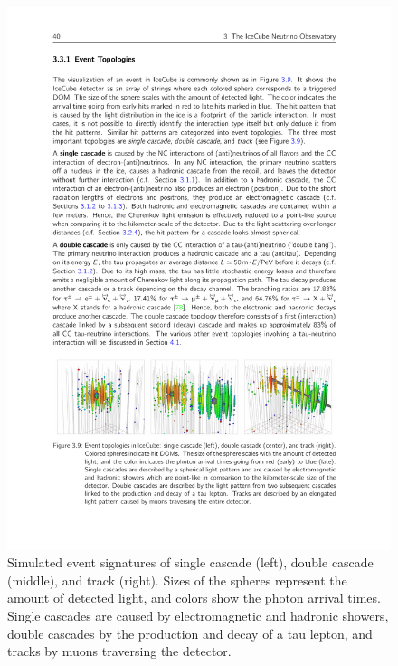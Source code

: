\begin{figure}
	\centering \includegraphics{./figures/nu_in_icecube/topologies.pdf}
	\caption{Simulated event signatures of single cascade (left), double cascade (middle), and track (right). Sizes of the spheres represent the amount of detected light, and colors show the photon arrival times. Single cascades are caused by electromagnetic and hadronic showers, double cascades by the production and decay of a tau lepton, and tracks by muons traversing the detector.}
\end{figure}

